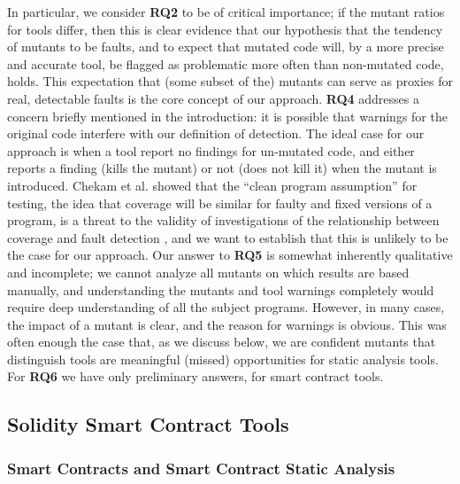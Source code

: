 In particular, we consider {\bf RQ2} to be of critical importance; if the mutant ratios for tools differ, then this is clear evidence that our hypothesis that the tendency of mutants to be faults, and to expect that mutated code will, by a more precise and accurate tool, be flagged as problematic more often than non-mutated code, holds.  This expectation that (some subset of the) mutants can serve as proxies for real, detectable faults is the core concept of our approach.
{\bf RQ4} addresses a concern briefly mentioned in the introduction:  it is possible that warnings for the original code interfere with our definition of detection.  The ideal case for our approach is when a tool report no findings for un-mutated code, and either reports a finding (kills the mutant) or not (does not kill it) when the mutant is introduced.  Chekam et al. showed that the ``clean program assumption'' for testing, the idea that coverage will be similar for faulty and fixed versions of a program, is a threat to the validity of investigations of the relationship between coverage and fault detection \cite{CleanProgram}, and we want to establish that this is unlikely to be the case for our approach.  Our answer to {\bf RQ5} is somewhat inherently qualitative and incomplete; we cannot analyze all mutants on which results are based manually, and understanding the mutants and tool warnings completely would require deep understanding of all the subject programs.  However, in many cases, the impact of a mutant is clear, and the reason for warnings is obvious.  This was often enough the case that, as we discuss below, we are confident mutants that distinguish tools are meaningful (missed) opportunities for static analysis tools.
For {\bf RQ6}  we have only preliminary answers, for smart contract tools.  

\subsection{Solidity Smart Contract Tools}

\subsubsection{Smart Contracts and Smart Contract Static Analysis}


